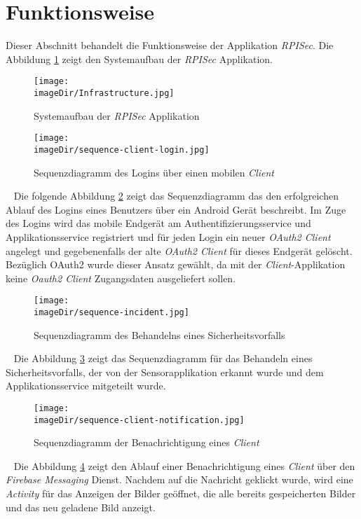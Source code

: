 \documentclass[]{article}
\newcommand{\imageDir}{images}
\begin{document}
\section{Funktionsweise}
Dieser Abschnitt behandelt die Funktionsweise der Applikation \emph{RPISec}. Die Abbildung \ref{fig:image-system-structure} zeigt den Systemaufbau der \emph{RPISec} Applikation. 
\begin{figure}[h]
	\centering
	\texttt{[image: \\imageDir/Infrastructure.jpg]}
	\caption{Systemaufbau der \emph{RPISec} Applikation}
	\label{fig:image-system-structure}
\end{figure}
\begin{figure}[h]
	\centering
	\texttt{[image: \\imageDir/sequence-client-login.jpg]}
	\caption{Sequenzdiagramm des Logins über einen mobilen \emph{Client}}
	\label{fig:image-sequence-client-login}
\end{figure}
\ \newline
Die folgende Abbildung \ref{fig:image-sequence-client-login} zeigt das Sequenzdiagramm das den erfolgreichen Ablauf des Logins eines Benutzers über ein Android Gerät beschreibt. Im Zuge des Logins wird das mobile Endgerät am Authentifizierungsservice und Applikationsservice registriert und für jeden Login ein neuer \emph{OAuth2 Client} angelegt und gegebenenfalls der alte \emph{OAuth2 Client} für dieses Endgerät gelöscht. Bezüglich OAuth2 wurde dieser Ansatz gewählt, da mit der \emph{Client}-Applikation keine \emph{Oauth2 Client} Zugangsdaten ausgeliefert sollen.
\ \newpage
\begin{figure}[h]
	\centering
	\texttt{[image: \\imageDir/sequence-incident.jpg]}
	\caption{Sequenzdiagramm des Behandelns eines Sicherheitsvorfalls}
	\label{fig:image-sequence-incident}
\end{figure}
\ \newline
Die Abbildung \ref{fig:image-sequence-incident} zeigt das Sequenzdiagramm für das Behandeln eines Sicherheitsvorfalls, der von der Sensorapplikation erkannt wurde und dem Applikationsservice mitgeteilt wurde.  
\begin{figure}[h]
	\centering
	\texttt{[image: \\imageDir/sequence-client-notification.jpg]}
	\caption{Sequenzdiagramm der Benachrichtigung eines \emph{Client}}
	\label{fig:image-sequence-client-notification}
\end{figure}
\ \newline
Die Abbildung \ref{fig:image-sequence-client-notification} zeigt den Ablauf einer  Benachrichtigung eines \emph{Client} über den \emph{Firebase Messaging} Dienst. Nachdem auf die Nachricht geklickt wurde, wird eine \emph{Activity} für das Anzeigen der Bilder geöffnet, die alle bereits gespeicherten Bilder und das neu geladene Bild anzeigt. 
\end{document}

